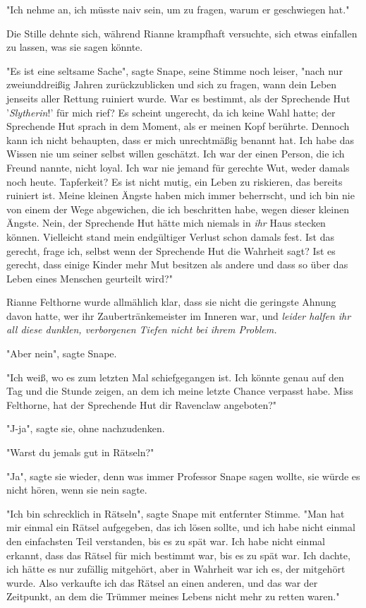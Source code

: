 {"Ich nehme an, ich müsste naiv sein, um zu fragen, warum er geschwiegen hat."

Die Stille dehnte sich, während Rianne krampfhaft versuchte, sich etwas einfallen zu lassen, was sie sagen könnte.

"Es ist eine seltsame Sache", sagte Snape, seine Stimme noch leiser, "nach nur zweiunddreißig Jahren zurückzublicken und sich zu fragen, wann dein Leben jenseits aller Rettung ruiniert wurde. War es bestimmt, als der Sprechende Hut '\emph{Slytherin}!' für mich rief? Es scheint ungerecht, da ich keine Wahl hatte; der Sprechende Hut sprach in dem Moment, als er meinen Kopf berührte. Dennoch kann ich nicht behaupten, dass er mich unrechtmäßig benannt hat. Ich habe das Wissen nie um seiner selbst willen geschätzt. Ich war der einen Person, die ich Freund nannte, nicht loyal. Ich war nie jemand für gerechte Wut, weder damals noch heute. Tapferkeit? Es ist nicht mutig, ein Leben zu riskieren, das bereits ruiniert ist. Meine kleinen Ängste haben mich immer beherrscht, und ich bin nie von einem der Wege abgewichen, die ich beschritten habe, wegen dieser kleinen Ängste. Nein, der Sprechende Hut hätte mich niemals in \emph{ihr} Haus stecken können. Vielleicht stand mein endgültiger Verlust schon damals fest. Ist das gerecht, frage ich, selbst wenn der Sprechende Hut die Wahrheit sagt? Ist es gerecht, dass einige Kinder mehr Mut besitzen als andere und dass so über das Leben eines Menschen geurteilt wird?"

Rianne Felthorne wurde allmählich klar, dass sie nicht die geringste Ahnung davon hatte, wer ihr Zaubertränkemeister im Inneren war, und \emph{leider halfen ihr all diese dunklen, verborgenen Tiefen nicht bei ihrem Problem.}

"Aber nein", sagte Snape.

"Ich weiß, wo es zum letzten Mal schiefgegangen ist. Ich könnte genau auf den Tag und die Stunde zeigen, an dem ich meine letzte Chance verpasst habe. Miss Felthorne, hat der Sprechende Hut dir Ravenclaw angeboten?"

"J-ja", sagte sie, ohne nachzudenken.

"Warst du jemals gut in Rätseln?"

"Ja", sagte sie wieder, denn was immer Professor Snape sagen wollte, sie würde es nicht hören, wenn sie nein sagte.

"Ich bin schrecklich in Rätseln", sagte Snape mit entfernter Stimme. "Man hat mir einmal ein Rätsel aufgegeben, das ich lösen sollte, und ich habe nicht einmal den einfachsten Teil verstanden, bis es zu spät war. Ich habe nicht einmal erkannt, dass das Rätsel für mich bestimmt war, bis es zu spät war. Ich dachte, ich hätte es nur zufällig mitgehört, aber in Wahrheit war ich es, der mitgehört wurde. Also verkaufte ich das Rätsel an einen anderen, und das war der Zeitpunkt, an dem die Trümmer meines Lebens nicht mehr zu retten waren."

}
